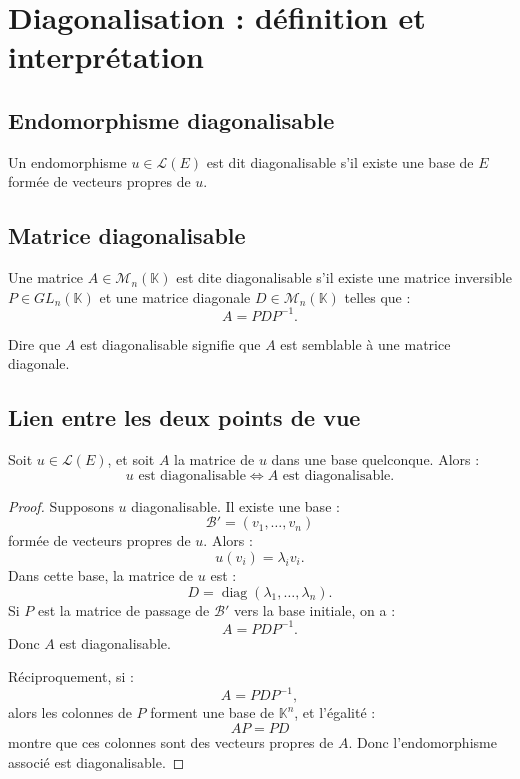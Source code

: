 \documentclass[11pt,a4paper]{article}
\newcommand{\K}{\mathbb K}
\newcommand{\M}{\mathcal M}
\newcommand{\Lcal}{\mathcal L}
\newcommand{\diag}{\operatorname{diag}}
\begin{document}
\section{Diagonalisation : définition et interprétation}

\subsection{Endomorphisme diagonalisable}

\begin{definitionbox}
Un endomorphisme \(u\in\Lcal(E)\) est dit diagonalisable s'il existe une base de \(E\) formée de vecteurs propres de \(u\).
\end{definitionbox}

\subsection{Matrice diagonalisable}

\begin{definitionbox}
Une matrice \(A\in\M_n(\K)\) est dite diagonalisable s'il existe une matrice inversible \(P\in GL_n(\K)\) et une matrice diagonale \(D\in\M_n(\K)\) telles que :
\[
A=PDP^{-1}.
\]
\end{definitionbox}

\begin{retenirbox}
Dire que \(A\) est diagonalisable signifie que \(A\) est semblable à une matrice diagonale.
\end{retenirbox}

\subsection{Lien entre les deux points de vue}

\begin{theorembox}
Soit \(u\in\Lcal(E)\), et soit \(A\) la matrice de \(u\) dans une base quelconque.  
Alors :
\[
u\text{ est diagonalisable}
\Longleftrightarrow
A\text{ est diagonalisable}.
\]
\end{theorembox}

\begin{proof}
Supposons \(u\) diagonalisable.  
Il existe une base :
\[
\mathcal B'=(v_1,\dots,v_n)
\]
formée de vecteurs propres de \(u\).  
Alors :
\[
u(v_i)=\lambda_i v_i.
\]
Dans cette base, la matrice de \(u\) est :
\[
D=\diag(\lambda_1,\dots,\lambda_n).
\]
Si \(P\) est la matrice de passage de \(\mathcal B'\) vers la base initiale, on a :
\[
A=PDP^{-1}.
\]
Donc \(A\) est diagonalisable.

Réciproquement, si :
\[
A=PDP^{-1},
\]
alors les colonnes de \(P\) forment une base de \(\K^n\), et l'égalité :
\[
AP=PD
\]
montre que ces colonnes sont des vecteurs propres de \(A\).  
Donc l'endomorphisme associé est diagonalisable.
\end{proof}
\end{document}
